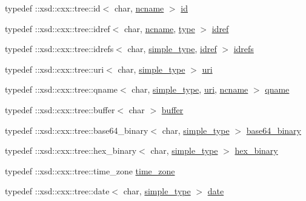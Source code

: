 \begin{DoxyCompactItemize}
\item 
typedef \+::xsd\+::cxx\+::tree\+::id$<$ char, \hyperlink{namespacexml__schema_adb64d7469eb27804ae649fbaccba54d6}{ncname} $>$ \hyperlink{namespacexml__schema_a551698f0c4c57e5e194dc1f2892da3ef}{id}
\item 
typedef \+::xsd\+::cxx\+::tree\+::idref$<$ char, \hyperlink{namespacexml__schema_adb64d7469eb27804ae649fbaccba54d6}{ncname}, \hyperlink{namespacexml__schema_a4bf7f144ce936a6a393de26f4cb707f0}{type} $>$ \hyperlink{namespacexml__schema_a50fe7403f3e6be3634976c84c1ea1f8c}{idref}
\item 
typedef \+::xsd\+::cxx\+::tree\+::idrefs$<$ char, \hyperlink{namespacexml__schema_a2ee8a034145ffa154d46910b41892495}{simple\+\_\+type}, \hyperlink{namespacexml__schema_a50fe7403f3e6be3634976c84c1ea1f8c}{idref} $>$ \hyperlink{namespacexml__schema_aac27fe5af9a5b2ee009fd3c9abe3abe9}{idrefs}
\item 
typedef \+::xsd\+::cxx\+::tree\+::uri$<$ char, \hyperlink{namespacexml__schema_a2ee8a034145ffa154d46910b41892495}{simple\+\_\+type} $>$ \hyperlink{namespacexml__schema_aad28b7e5769e04950db7f4bd15c163be}{uri}
\item 
typedef \+::xsd\+::cxx\+::tree\+::qname$<$ char, \hyperlink{namespacexml__schema_a2ee8a034145ffa154d46910b41892495}{simple\+\_\+type}, \hyperlink{namespacexml__schema_aad28b7e5769e04950db7f4bd15c163be}{uri}, \hyperlink{namespacexml__schema_adb64d7469eb27804ae649fbaccba54d6}{ncname} $>$ \hyperlink{namespacexml__schema_a5343b1a86a36b809f1acf953a2497af2}{qname}
\item 
typedef \+::xsd\+::cxx\+::tree\+::buffer$<$ char $>$ \hyperlink{namespacexml__schema_a3a1af5d598f84fcd6707cc9f84880533}{buffer}
\item 
typedef \+::xsd\+::cxx\+::tree\+::base64\+\_\+binary$<$ char, \hyperlink{namespacexml__schema_a2ee8a034145ffa154d46910b41892495}{simple\+\_\+type} $>$ \hyperlink{namespacexml__schema_a6a44de5a5883b8a6377178c988a87b93}{base64\+\_\+binary}
\item 
typedef \+::xsd\+::cxx\+::tree\+::hex\+\_\+binary$<$ char, \hyperlink{namespacexml__schema_a2ee8a034145ffa154d46910b41892495}{simple\+\_\+type} $>$ \hyperlink{namespacexml__schema_ac9db22d87610e02355669749770fac89}{hex\+\_\+binary}
\item 
typedef \+::xsd\+::cxx\+::tree\+::time\+\_\+zone \hyperlink{namespacexml__schema_ab32f228c8863c36bf48dbb7356c50c0e}{time\+\_\+zone}
\item 
typedef \+::xsd\+::cxx\+::tree\+::date$<$ char, \hyperlink{namespacexml__schema_a2ee8a034145ffa154d46910b41892495}{simple\+\_\+type} $>$ \hyperlink{namespacexml__schema_abc702b2b5f66618b0fdbbbe484492b4d}{date}

\end{DoxyCompactItemize}
